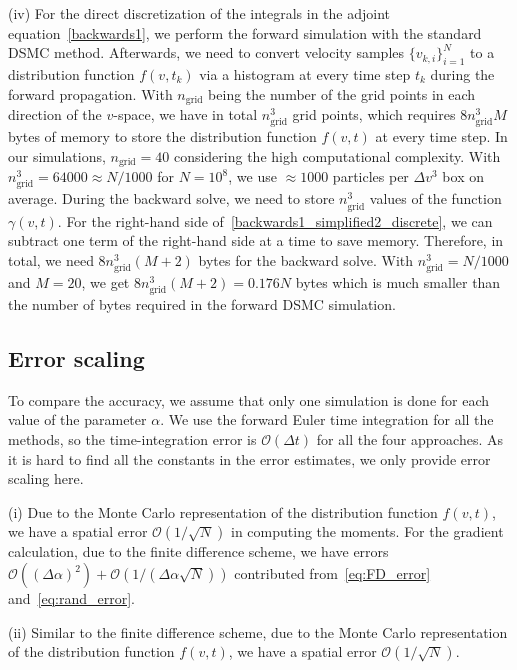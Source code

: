 \documentclass[times,final,nopreprintline]{elsarticle}
\newcommand{\cO}{\mathcal O} \newcommand{\cP}{\mathcal P}
\begin{document}
(iv) For the direct discretization of the integrals in the adjoint equation~\eqref{backwards1}, we perform the forward simulation with the standard DSMC method. Afterwards, we need to convert velocity samples $\{v_{k,i}\}_{i=1}^N$ to a distribution function $f(v,t_k)$ via a histogram at every time step $t_k$ during the forward propagation. With $n_\text{grid}$ being the number of the grid points in each direction of the $v$-space, we have in total $n_\text{grid}^3$ grid points, which requires $8 n_\text{grid}^3 M$ bytes of memory to store the distribution function $f(v,t)$ at every time step. In our simulations, $n_\text{grid}=40$ considering the high computational complexity. With $n_\text{grid}^3=64000 \approx N/1000$ for $N=10^8$, we use $\approx1000$ particles per $\Delta v^3$ box on average.
During the backward solve, we need to store $n_\text{grid}^3$ values of the function $\gamma(v,t)$. For the right-hand side of~\eqref{backwards1_simplified2_discrete}, we can subtract one term of the right-hand side at a time to save memory. Therefore, in total, we need $8 n_\text{grid}^3 (M+2)$ bytes for the backward solve.
With $n_\text{grid}^3=N/1000$ and $M=20$, we get $8 n_\text{grid}^3 (M+2) = 0.176 N$ bytes  which is much smaller than the number of bytes required in the forward DSMC simulation.


\subsection{Error scaling}
To compare the accuracy, we assume that only one simulation is done for each value of the parameter $\alpha$. We use the forward Euler time integration for all the methods, so the time-integration error is $\cO(\Delta t)$ for all the four approaches. As it is hard to find all the constants in the error estimates, we only provide error scaling here.

(i) Due to the Monte Carlo representation of the distribution function $f(v,t)$, we have a spatial error $\cO(1/\sqrt{N})$ in computing the moments. For the gradient calculation, due to the finite difference scheme, we have errors $\cO((\Delta \alpha)^2)+\cO(1/(\Delta \alpha \sqrt{N}))$ contributed from~\eqref{eq:FD_error} and~\eqref{eq:rand_error}. %

(ii) Similar to the finite difference scheme, due to the Monte Carlo representation of the distribution function $f(v,t)$, we have a spatial error $\cO(1/\sqrt{N})$.
\end{document}
